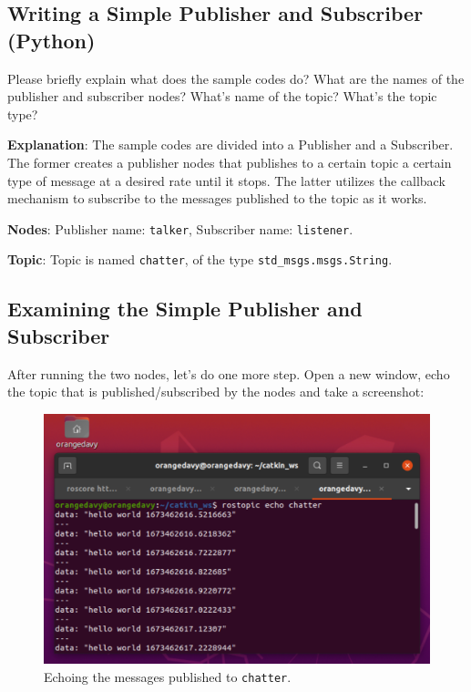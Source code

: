 \documentclass[12pt]{article}
\begin{document}
\subsection{Writing a Simple Publisher and Subscriber (Python)}
Please briefly explain what does the sample codes do? What are the names of the publisher and subscriber nodes? What's name of the topic? What's the topic type?

\setlength{\parskip}{1em}
\textbf{Explanation}: The sample codes are divided into a Publisher and a Subscriber. The former creates a publisher nodes that publishes to a certain topic a certain type of message at a desired rate until it stops.
The latter utilizes the callback mechanism to subscribe to the messages published to the topic as it works.

\textbf{Nodes}: Publisher name: \texttt{talker}, Subscriber name: \texttt{listener}.

\textbf{Topic}: Topic is named \texttt{chatter}, of the type \texttt{std_msgs.msgs.String}.

\subsection{Examining the Simple Publisher and Subscriber}
After running the two nodes, let's do one more step. Open a new window, echo the topic that is published/subscribed by the nodes and take a screenshot:

\begin{figure}[H]
  \centering\includegraphics[width=14cm]{images/rostopic_echo_chatter.png}\vspace{-10pt}
  \caption{Echoing the messages published to \texttt{chatter}.}\label{fig:rostopic_echo_chatter}
  \end{figure}
\end{document}
